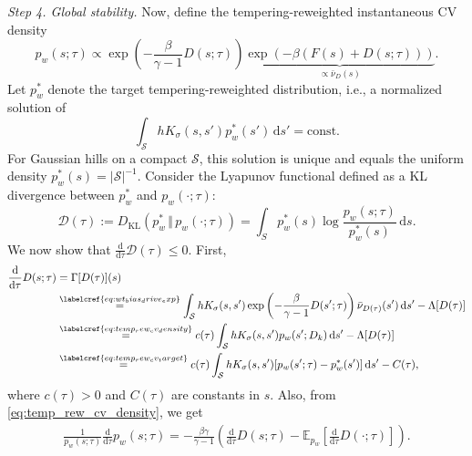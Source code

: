 \documentclass[]{fairmeta}
\theoremstyle{remark}
\begin{document}
\textit{Step 4. Global stability.}
Now, define the tempering-reweighted instantaneous CV density
\begin{equation}
p_w(s; \tau) \propto \exp\left(-\frac{\beta}{\gamma - 1}D(s; \tau)\right) \underbrace{\exp(-\beta(F(s)+D(s; \tau)))}_{\propto \bar{\nu}_{D}(s)}.
\label{eq:temp_rew_cv_density}
\end{equation}
Let $p_w^\ast$ denote the target tempering-reweighted distribution, i.e., a normalized solution of
\begin{equation}
\int_\mathcal{S} h K_\sigma (s, s') p_w^\ast(s') \, \mathrm{d}s' = \mathrm{const.}
\label{eq:temp_rew_cv_target}
\end{equation}
For Gaussian hills on a compact $\mathcal{S}$, this solution is unique and equals the uniform density $p_w^\ast(s) = |\mathcal{S}|^{-1}$.
Consider the Lyapunov functional defined as a KL divergence between $p_w^\ast$ and $p_w(\cdot; \tau)$:
\begin{equation}
\mathcal{D}(\tau) := D_\text{KL}(p_w^\ast \, \Vert \, p_w(\cdot; \tau)) = \int_S p_w^\ast(s) \log \frac{p_w(s; \tau)}{p_w^\ast(s)} \, \mathrm{d}s.
\label{eq:lyapunov}
\end{equation}
We now show that $\frac{\mathrm{d}}{\mathrm{d}\tau} \mathcal{D}(\tau) \le 0$.
First,
\begin{align}
\frac{\mathrm{d}}{\mathrm{d}\tau} D(s; \tau) &= \Gamma[D(\tau)](s) \\
& \stackrel{\labelcref{eq:wt_bias_drive_exp}}{=} \int_\mathcal{S} h K_\sigma (s, s') \exp \left( -\frac{\beta}{\gamma - 1} D(s'; \tau) \right) \bar{\nu}_{D(\tau)}(s') \, \mathrm{d}s' - \Lambda[D(\tau)] \\
& \stackrel{\labelcref{eq:temp_rew_cv_density}}{=} c(\tau) \int_\mathcal{S} h K_\sigma (s, s') p_w (s'; D_k) \, \mathrm{d}s' - \Lambda[D(\tau)] \\
& \stackrel{\labelcref{eq:temp_rew_cv_target}}{=} c(\tau) \int_\mathcal{S} hK_\sigma(s, s') [p_w(s'; \tau) - p_w^\ast(s') ] \, \mathrm{d}s' - C(\tau),
\label{eq:drive_dt}
\end{align}
where $c(\tau) > 0$ and $C(\tau)$ are constants in $s$.
Also, from \cref{eq:temp_rew_cv_density}, we get
\begin{align}
\frac{1}{p_w(s; \tau)} \frac{\mathrm{d}}{\mathrm{d}\tau} p_w(s; \tau) = -\frac{\beta\gamma}{\gamma - 1} \left( \frac{\mathrm{d}}{\mathrm{d}\tau} D(s; \tau) - \mathbb{E}_{p_w}\left[ \frac{\mathrm{d}}{\mathrm{d}\tau} D(\cdot; \tau)\right]\right).
\label{eq:temp_rew_cv_dt}
\end{align}
\end{document}
